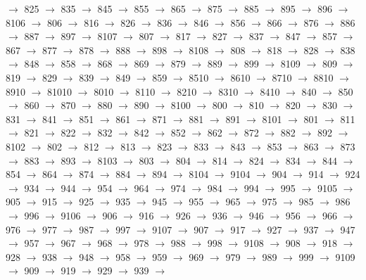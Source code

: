 $\rightarrow$ 825 $\rightarrow$ 835 $\rightarrow$ 845 $\rightarrow$ 855 $\rightarrow$ 865 $\rightarrow$ 875 $\rightarrow$ 885 $\rightarrow$ 895 $\rightarrow$ 896 $\rightarrow$ 8106 $\rightarrow$ 806 $\rightarrow$ 816 $\rightarrow$ 826 $\rightarrow$ 836 $\rightarrow$ 846 $\rightarrow$ 856 $\rightarrow$ 866 $\rightarrow$ 876 $\rightarrow$ 886 $\rightarrow$ 887 $\rightarrow$ 897 $\rightarrow$ 8107 $\rightarrow$ 807 $\rightarrow$ 817 $\rightarrow$ 827 $\rightarrow$ 837 $\rightarrow$ 847 $\rightarrow$ 857 $\rightarrow$ 867 $\rightarrow$ 877 $\rightarrow$ 878 $\rightarrow$ 888 $\rightarrow$ 898 $\rightarrow$ 8108 $\rightarrow$ 808 $\rightarrow$ 818 $\rightarrow$ 828 $\rightarrow$ 838 $\rightarrow$ 848 $\rightarrow$ 858 $\rightarrow$ 868 $\rightarrow$ 869 $\rightarrow$ 879 $\rightarrow$ 889 $\rightarrow$ 899 $\rightarrow$ 8109 $\rightarrow$ 809 $\rightarrow$ 819 $\rightarrow$ 829 $\rightarrow$ 839 $\rightarrow$ 849 $\rightarrow$ 859 $\rightarrow$ 8510 $\rightarrow$ 8610 $\rightarrow$ 8710 $\rightarrow$ 8810 $\rightarrow$ 8910 $\rightarrow$ 81010 $\rightarrow$ 8010 $\rightarrow$ 8110 $\rightarrow$ 8210 $\rightarrow$ 8310 $\rightarrow$ 8410 $\rightarrow$ 840 $\rightarrow$ 850 $\rightarrow$ 860 $\rightarrow$ 870 $\rightarrow$ 880 $\rightarrow$ 890 $\rightarrow$ 8100 $\rightarrow$ 800 $\rightarrow$ 810 $\rightarrow$ 820 $\rightarrow$ 830 $\rightarrow$ 831 $\rightarrow$ 841 $\rightarrow$ 851 $\rightarrow$ 861 $\rightarrow$ 871 $\rightarrow$ 881 $\rightarrow$ 891 $\rightarrow$ 8101 $\rightarrow$ 801 $\rightarrow$ 811 $\rightarrow$ 821 $\rightarrow$ 822 $\rightarrow$ 832 $\rightarrow$ 842 $\rightarrow$ 852 $\rightarrow$ 862 $\rightarrow$ 872 $\rightarrow$ 882 $\rightarrow$ 892 $\rightarrow$ 8102 $\rightarrow$ 802 $\rightarrow$ 812 $\rightarrow$ 813 $\rightarrow$ 823 $\rightarrow$ 833 $\rightarrow$ 843 $\rightarrow$ 853 $\rightarrow$ 863 $\rightarrow$ 873 $\rightarrow$ 883 $\rightarrow$ 893 $\rightarrow$ 8103 $\rightarrow$ 803 $\rightarrow$ 804 $\rightarrow$ 814 $\rightarrow$ 824 $\rightarrow$ 834 $\rightarrow$ 844 $\rightarrow$ 854 $\rightarrow$ 864 $\rightarrow$ 874 $\rightarrow$ 884 $\rightarrow$ 894 $\rightarrow$ 8104 $\rightarrow$ 9104 $\rightarrow$ 904 $\rightarrow$ 914 $\rightarrow$ 924 $\rightarrow$ 934 $\rightarrow$ 944 $\rightarrow$ 954 $\rightarrow$ 964 $\rightarrow$ 974 $\rightarrow$ 984 $\rightarrow$ 994 $\rightarrow$ 995 $\rightarrow$ 9105 $\rightarrow$ 905 $\rightarrow$ 915 $\rightarrow$ 925 $\rightarrow$ 935 $\rightarrow$ 945 $\rightarrow$ 955 $\rightarrow$ 965 $\rightarrow$ 975 $\rightarrow$ 985 $\rightarrow$ 986 $\rightarrow$ 996 $\rightarrow$ 9106 $\rightarrow$ 906 $\rightarrow$ 916 $\rightarrow$ 926 $\rightarrow$ 936 $\rightarrow$ 946 $\rightarrow$ 956 $\rightarrow$ 966 $\rightarrow$ 976 $\rightarrow$ 977 $\rightarrow$ 987 $\rightarrow$ 997 $\rightarrow$ 9107 $\rightarrow$ 907 $\rightarrow$ 917 $\rightarrow$ 927 $\rightarrow$ 937 $\rightarrow$ 947 $\rightarrow$ 957 $\rightarrow$ 967 $\rightarrow$ 968 $\rightarrow$ 978 $\rightarrow$ 988 $\rightarrow$ 998 $\rightarrow$ 9108 $\rightarrow$ 908 $\rightarrow$ 918 $\rightarrow$ 928 $\rightarrow$ 938 $\rightarrow$ 948 $\rightarrow$ 958 $\rightarrow$ 959 $\rightarrow$ 969 $\rightarrow$ 979 $\rightarrow$ 989 $\rightarrow$ 999 $\rightarrow$ 9109 $\rightarrow$ 909 $\rightarrow$ 919 $\rightarrow$ 929 $\rightarrow$ 939 $\rightarrow$ 